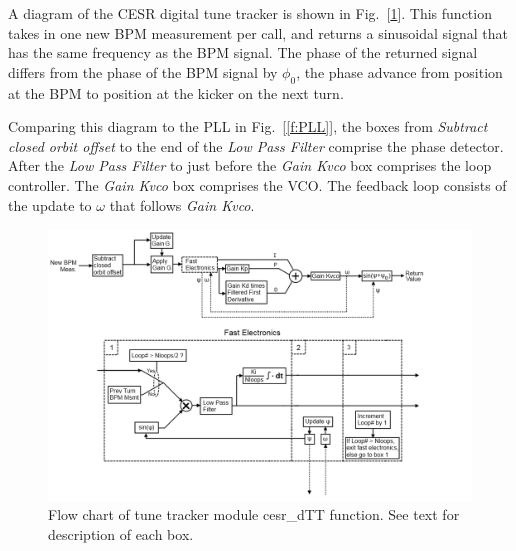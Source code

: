 A diagram of the CESR digital tune tracker is shown in
Fig.~[\ref{f:CdTT}].  This function takes in one new BPM measurement
per call, and returns a sinusoidal signal that has the same frequency
as the BPM signal.  The phase of the returned signal differs from the
phase of the BPM signal by $\phi_0$, the phase advance from position
at the BPM to position at the kicker on the next turn.

Comparing this diagram to the PLL in Fig.~[\ref{f:PLL}], the boxes
from {\it Subtract closed orbit offset} to the end of the {\it Low
Pass Filter} comprise the phase detector.  After the {\it Low Pass
Filter} to just before the {\it Gain Kvco} box comprises the loop
controller.  The {\it Gain Kvco} box comprises the VCO.  The feedback
loop consists of the update to $\omega$ that follows {\it Gain Kvco}.

\begin{figure}
\includegraphics[width=\columnwidth]{TT-Flow.png}
\caption{
Flow chart of tune tracker module cesr\_dTT function.  See text for description of each box.}
\label{f:CdTT}
\end{figure}

\clearpage

